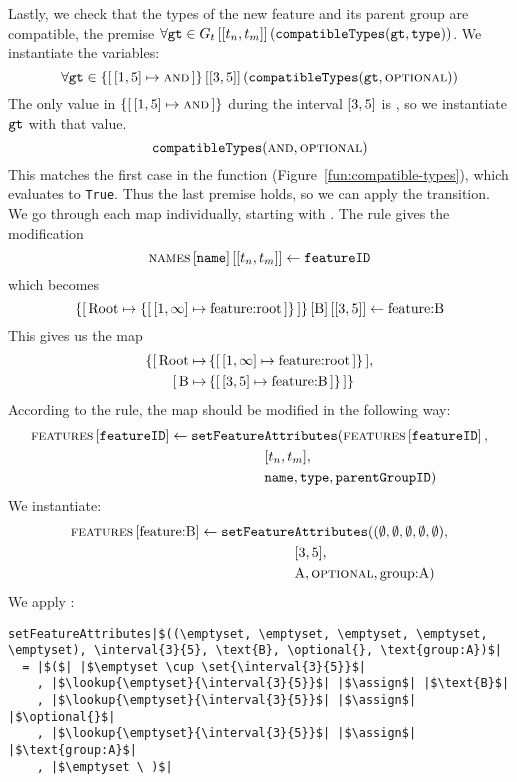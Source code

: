 Lastly, we check that the types of the new feature and its parent group are compatible, the premise $\forall \var{gt} \in \lookup{G_t}{\interval{t_n}{t_m}} (\var{compatibleTypes}(\var{gt}, \var{type}))$. We instantiate the variables:
\[
  \forall \var{gt} \in \lookup{\set{\intervalmapping{1}{5}{\andtype}}}{\interval{3}{5}}(\var{compatibleTypes}(\var{gt}, \optional{}))
\]
The only value in $\set{\intervalmapping{1}{5}{\andtype}}$ during the interval $\interval{3}{5}$ is \andtype, so we instantiate $\texttt{gt}$ with that value.
\[
  \texttt{compatibleTypes}(\textsc{and}{}, \textsc{optional}{})
\]
This matches the first case in the  function (Figure~\ref{fun:compatible-types}), which evaluates to \texttt{True}. Thus the last premise holds, so we can apply the transition. We go through each map individually, starting with \names{}. The rule gives the modification
\[
  \lookup{\lookup{\names{}}{\var{name}}}{\interval{t_n}{t_m}} \assign \var{featureID}
\]
which becomes
\[
  \lookup{\lookup{\{  \mapping{\text{Root}}{\set{\intervalmapping{1}{\forever}{\text{feature:root}}}}\}}{\text{B}}}{\interval{3}{5}} \assign \text{feature:B}
\]
This gives us the map
\begin{align*}
  \{\mapping{\text{Root}}{& \set{\intervalmapping{1}{\forever}{\text{feature:root}}}}, \\
   \mapping{\text{B}}{& \set{\intervalmapping{3}{5}{\text{feature:B}}}}\} 
\end{align*}
According to the rule, the \features{} map should be modified in the following way:
\begin{align*}
  \lookup{\features{}}{\var{featureID}} \assign \var{setFeature}&\var{Attributes}(\lookup{\features{}}{\var{featureID}}, \\
                           &\interval{t_n}{t_m},\\
                           &\var{name}, \var{type}, \var{parentGroupID})
\end{align*}
We instantiate:
\begin{align*}
  \lookup{\features{}}{\text{feature:B}} \assign \var{setFeature}&\var{Attributes}((\emptyset, \emptyset, \emptyset, \emptyset, \emptyset), \\
                           &\interval{3}{5},\\
                           &\text{A}, \optional{}, \text{group:A})
\end{align*}
We apply :
\begin{verbatim}
setFeatureAttributes|$((\emptyset, \emptyset, \emptyset, \emptyset, \emptyset), \interval{3}{5}, \text{B}, \optional{}, \text{group:A})$|
  = |$($| |$\emptyset \cup \set{\interval{3}{5}}$|
    , |$\lookup{\emptyset}{\interval{3}{5}}$| |$\assign$| |$\text{B}$|
    , |$\lookup{\emptyset}{\interval{3}{5}}$| |$\assign$| |$\optional{}$|
    , |$\lookup{\emptyset}{\interval{3}{5}}$| |$\assign$| |$\text{group:A}$|
    , |$\emptyset \ )$|
 \end{verbatim}
